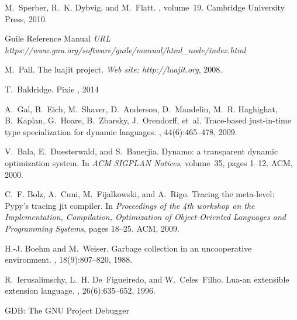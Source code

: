 \documentclass[preprint, numbers]{sigplanconf}
\begin{document}
\begin{thebibliography}{}
 M.~Sperber, R.~K. Dybvig, and M.~Flatt.
  ,
  volume~19.  \newblock Cambridge University Press, 2010.

 Guile Reference Manual \newblock
  {\em URL https://www.gnu.org/software/guile/manual/html\_node/index.html}

 M.~Pall.  \newblock The luajit project.  \newblock
  {\em Web site: http://luajit.org}, 2008.

 T.~Baldridge.  \newblock Pixie , 2014

A.~Gal, B.~Eich, M.~Shaver, D.~Anderson, D.~Mandelin, M.~R. Haghighat,
  B.~Kaplan, G.~Hoare, B.~Zbarsky, J.~Orendorff, et~al.
\newblock Trace-based just-in-time type specialization for dynamic languages.
, 44(6):465--478, 2009.

V.~Bala, E.~Duesterwald, and S.~Banerjia.
\newblock Dynamo: a transparent dynamic optimization system.
\newblock In {\em ACM SIGPLAN Notices}, volume~35, pages 1--12. ACM, 2000.

C.~F. Bolz, A.~Cuni, M.~Fijalkowski, and A.~Rigo.
\newblock Tracing the meta-level: Pypy's tracing jit compiler.
\newblock In {\em Proceedings of the 4th workshop on the Implementation,
  Compilation, Optimization of Object-Oriented Languages and Programming
  Systems}, pages 18--25. ACM, 2009.

H.-J. Boehm and M.~Weiser.
\newblock Garbage collection in an uncooperative environment.
, 18(9):807--820, 1988.

R.~Ierusalimschy, L.~H. De~Figueiredo, and W.~Celes~Filho.
\newblock Lua-an extensible extension language.
, 26(6):635--652, 1996.

  \newblock GDB: The GNU Project Debugger

\end{thebibliography}
\end{document}

